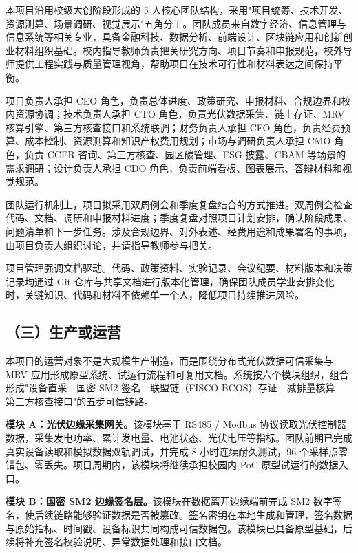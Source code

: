 \documentclass[12pt,a4paper]{article}
\begin{document}
本项目沿用校级大创阶段形成的 5 人核心团队结构，采用"项目统筹、技术开发、资源测算、场景调研、视觉展示"五角分工。团队成员来自数字经济、信息管理与信息系统等相关专业，具备金融科技、数据分析、前端设计、区块链应用和创新创业材料组织基础。校内指导教师负责把关研究方向、项目节奏和申报规范，校外导师提供工程实践与质量管理视角，帮助项目在技术可行性和材料表达之间保持平衡。

项目负责人承担 CEO 角色，负责总体进度、政策研究、申报材料、合规边界和校内资源协调；技术负责人承担 CTO 角色，负责光伏数据采集、链上存证、MRV 核算引擎、第三方核查接口和系统联调；财务负责人承担 CFO 角色，负责经费预算、成本控制、资源测算和知识产权费用规划；市场与调研负责人承担 CMO 角色，负责 CCER 咨询、第三方核查、园区碳管理、ESG 披露、CBAM 等场景的需求调研；设计负责人承担 CDO 角色，负责前端看板、图表展示、答辩材料和视觉规范。

团队运行机制上，项目拟采用双周例会和季度复盘结合的方式推进。双周例会检查代码、文档、调研和申报材料进度；季度复盘对照项目计划安排，确认阶段成果、问题清单和下一步任务。涉及合规边界、对外表述、经费用途和成果署名的事项，由项目负责人组织讨论，并请指导教师参与把关。

项目管理强调文档驱动。代码、政策资料、实验记录、会议纪要、材料版本和决策记录均通过 Git 仓库与共享文档进行版本化管理，确保团队成员学业安排变化时，关键知识、代码和材料不依赖单一个人，降低项目持续推进风险。


\subsection*{（三）生产或运营}

本项目的运营对象不是大规模生产制造，而是围绕分布式光伏数据可信采集与 MRV 应用形成原型系统、试运行流程和可复用文档。系统按六个模块组织，组合形成"设备直采—国密 SM2 签名—联盟链（FISCO-BCOS）存证—减排量核算—第三方核查接口"的五步可信链路。

\textbf{模块 A：光伏边缘采集网关。}该模块基于 RS485 / Modbus 协议读取光伏控制器数据，采集发电功率、累计发电量、电池状态、光伏电压等指标。团队前期已完成真实设备读取和模拟数据双轨调试，并完成 8 小时连续耐久测试，96 个采样点零错包、零丢失。项目周期内，该模块将继续承担校园内 PoC 原型试运行的数据入口。

\textbf{模块 B：国密 SM2 边缘签名层。}该模块在数据离开边缘端前完成 SM2 数字签名，使后续链路能够验证数据是否被篡改。签名密钥在本地生成和管理，签名数据与原始指标、时间戳、设备标识共同构成可信数据包。该模块已具备原型基础，后续将补充签名校验说明、异常数据处理和接口文档。
\end{document}
